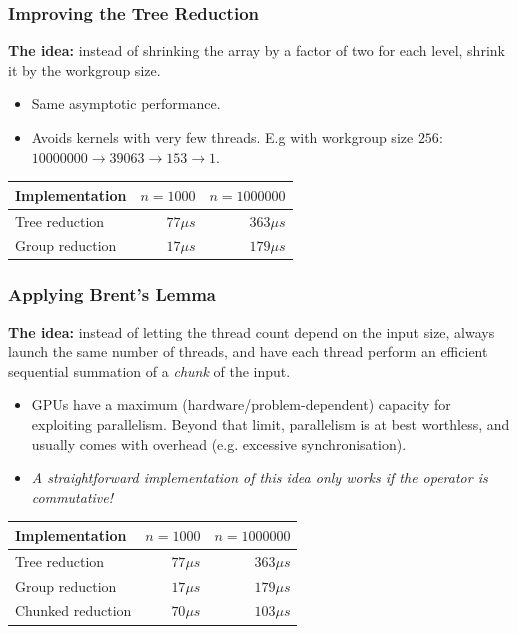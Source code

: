 \documentclass{beamer}
\begin{document}
\begin{frame}
  \frametitle{Improving the Tree Reduction}

  \textbf{The idea:} instead of shrinking the array by a factor of two
  for each level, shrink it by the workgroup size.

  \begin{itemize}
  \item Same asymptotic performance.
  \item Avoids kernels with very few threads.  E.g with workgroup size
    $256$: $10000000 \rightarrow 39063 \rightarrow 153 \rightarrow 1$.
  \end{itemize}

\pause\bigskip

  \begin{tabular}{lrr}
    \textbf{Implementation} & $n=1000$ & $n=1000000$ \\\hline
    Tree reduction & $77\mu{}s$ & $363\mu{}s$ \\
    Group reduction & $17\mu{}s$ & $179\mu{}s$ \\
  \end{tabular}

\end{frame}

\begin{frame}
  \frametitle{Applying Brent's Lemma}

  \textbf{The idea:} instead of letting the thread count depend on the
  input size, always launch the same number of threads, and have each
  thread perform an efficient sequential summation of a \textit{chunk}
  of the input.

  \begin{itemize}
  \item GPUs have a maximum (hardware/problem-dependent) capacity for
    exploiting parallelism.  Beyond that limit, parallelism is at best
    worthless, and usually comes with overhead (e.g. excessive
    synchronisation).
  \item \textit{A straightforward implementation of this idea only
      works if the operator is commutative!}
  \end{itemize}

\pause\bigskip

  \begin{tabular}{lrr}
    \textbf{Implementation} & $n=1000$ & $n=1000000$ \\\hline
    Tree reduction & $77\mu{}s$ & $363\mu{}s$ \\
    Group reduction & $17\mu{}s$ & $179\mu{}s$ \\
    Chunked reduction & $70\mu{}s$ & $103\mu{}s$ \\
  \end{tabular}

\end{frame}
\end{document}
